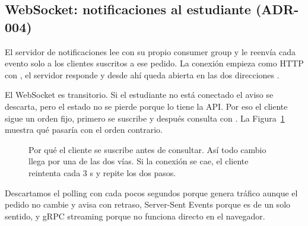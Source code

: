 \subsection{WebSocket: notificaciones al estudiante (ADR-004)}

El servidor de notificaciones lee  con su propio consumer group y le reenvía cada evento solo a los clientes suscritos a ese pedido. La conexión empieza como HTTP con , el servidor responde  y desde ahí queda abierta en las dos direcciones \parencite{mdn2024websockets}.

El WebSocket es transitorio. Si el estudiante no está conectado el aviso se descarta, pero el estado no se pierde porque lo tiene la API. Por eso el cliente sigue un orden fijo, primero se suscribe y después consulta con . La Figura~\ref{fig:orden} muestra qué pasaría con el orden contrario.

\begin{figure}[H]
\centering
{}
\caption{Por qué el cliente se suscribe antes de consultar. Así todo cambio llega por una de las dos vías. Si la conexión se cae, el cliente reintenta cada 3 s y repite los dos pasos.}
\label{fig:orden}
\end{figure}

Descartamos el polling con  cada pocos segundos porque genera tráfico aunque el pedido no cambie y avisa con retraso, Server-Sent Events porque es de un solo sentido, y gRPC streaming porque no funciona directo en el navegador.

